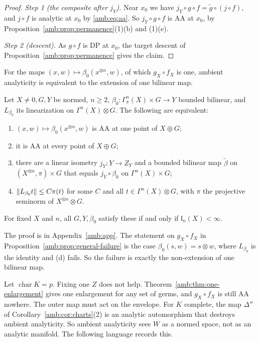 \begin{proof}
\emph{Step 1 (the composite after $j_Y$).} Near $x_0$ we have $j_Y\circ g\circ f=\tilde g\circ(j\circ f)$, and $j\circ f$ is analytic at $x_0$ by \eqref{amb:eq:aa}. So $j_Y\circ g\circ f$ is AA at $x_0$, by Proposition~\ref{amb:prop:permanence}(1)(b) and (1)(e).

\emph{Step 2 (descent).} As $g\circ f$ is DP at $x_0$, the target descent of Proposition~\ref{amb:prop:permanence} gives the claim.
\end{proof}

For the maps $(x,w)\mapsto\beta_0(x^{\otimes n},w)$, of which $g_X\circ f_X$ is one, ambient analyticity is equivalent to the extension of one bilinear map.

\begin{theorem}\label{amb:thm:channel}
Let $X\ne0,G,Y$ be normed, $n\ge2$, $\beta_0\colon\Gamma^n_\pi(X)\times G\to Y$ bounded bilinear, and $L_{\beta_0}$ its linearization on $\Gamma^n(X)\otimes G$. The following are equivalent:
\begin{enumerate}
\item[\textup{(a)}] $(x,w)\mapsto\beta_0(x^{\otimes n},w)$ is AA at one point of $X\oplus G$;
\item[\textup{(b)}] it is AA at every point of $X\oplus G$;
\item[\textup{(c)}] there are a linear isometry $j_Y\colon Y\to Z_Y$ and a bounded bilinear map $\tilde\beta$ on $(X^{\otimes n},\pi)\times G$ that equals $j_Y\circ\beta_0$ on $\Gamma^n(X)\times G$;
\item[\textup{(d)}] $\lVert L_{\beta_0}t\rVert\le C\pi(t)$ for some $C$ and all $t\in\Gamma^n(X)\otimes G$, with $\pi$ the projective seminorm of $X^{\otimes n}\otimes G$.
\end{enumerate}
For fixed $X$ and $n$, all $G,Y,\beta_0$ satisfy these if and only if $\mathfrak l_n(X)<\infty$.
\end{theorem}
The proof is in Appendix~\ref{amb:app}. The statement on $g_X\circ f_X$ in Proposition~\ref{amb:prop:general-failure} is the case $\beta_0(s,w)=s\otimes w$, where $L_{\beta_0}$ is the identity and (d) fails. So the failure is exactly the non-extension of one bilinear map.

Let $\operatorname{char}K=p$. Fixing one $Z$ does not help. Theorem~\ref{amb:thm:one-enlargement} gives one enlargement for any set of germs, and $g_X\circ f_X$ is still AA nowhere. The outer map must act on the envelope. For $K$ complete, the map $\Delta''$ of Corollary~\ref{amb:cor:charts}(2) is an analytic automorphism that destroys ambient analyticity. So ambient analyticity sees $W$ as a normed space, not as an analytic manifold. The following language records this.


